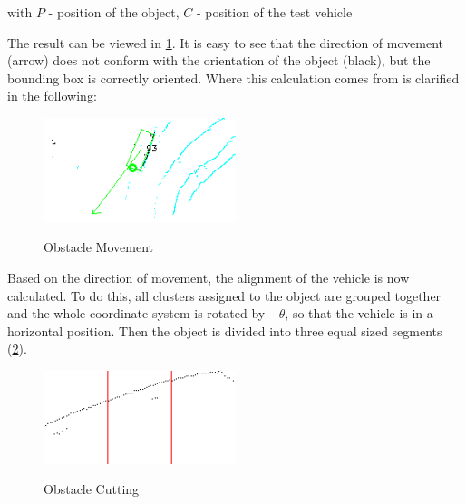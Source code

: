 \documentclass[11pt,oneside,openright]{mpreport}
\begin{document}
with $P$ - position of the object, $C$ - position of the test vehicle


The result can be viewed in \cref{obst_rot}. It is easy to see that the direction of movement (arrow) does not conform with the orientation of the object (black), 
but the bounding box is correctly oriented. Where this calculation comes from is clarified in the following:

\begin{figure}[!ht]
\begin{center}
\caption{Obstacle Movement}
\includegraphics[width=0.5\textwidth]{bilder/obst_rot.png}
\label{obst_rot}
\end{center}
\end{figure}


Based on the direction of movement, the alignment of the vehicle is now calculated. To do this, all clusters assigned to the object are grouped together and 
the whole coordinate system is rotated by $-\theta$, so that the vehicle is in a horizontal position.
Then the object is divided into three equal sized segments (\cref{obst_devide}).

\begin{figure}[!ht]
\begin{center}
\caption{Obstacle Cutting}
\includegraphics[width=0.5\textwidth]{bilder/obst_devide.png}
\label{obst_devide}
\end{center}
\end{figure}
\end{document}
